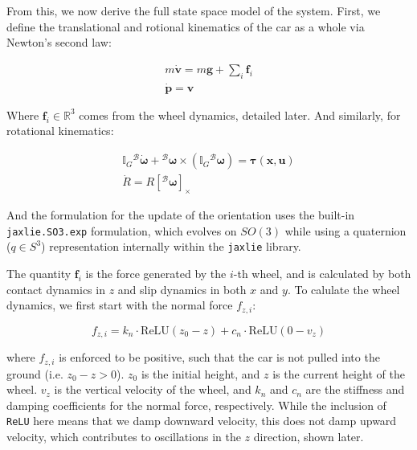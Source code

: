 From this, we now derive the full state space model of the system. First, we define the translational and rotional kinematics of the car as a whole via Newton's second law:

\begin{equation}
  \begin{gathered}
    m\dot{\mathbf{v}} = m\mathbf{g} + \sum_i \mathbf{f}_i \\
    \dot{\mathbf{p}} = \mathbf{v}
  \end{gathered}
\end{equation}

Where $\mathbf{f}_i\in\mathbb{R}^3$ comes from the wheel dynamics, detailed later. And similarly, for rotational kinematics:

\begin{equation}
  \begin{gathered}
    \mathbb{I}_G{}^\mathcal{B}\dot{\boldsymbol{\omega}} + {}^\mathcal{B}\boldsymbol{\omega} \times \left(\mathbb{I}_G{}^\mathcal{B}\boldsymbol{\omega}\right) = \boldsymbol{\tau}(\mathbf{x,u}) \\
    \dot{R} = R[{}^\mathcal{B}\boldsymbol{\omega}]_\times
  \end{gathered}
\end{equation}

And the formulation for the update of the orientation uses the built-in \texttt{jaxlie.SO3.exp} formulation, which evolves on $SO(3)$ while using a quaternion ($q\in S^3$) representation internally within the \texttt{jaxlie} library.

The quantity $\mathbf{f}_i$ is the force generated by the $i$-th wheel, and is calculated by both contact dynamics in $z$ and slip dynamics in both $x$ and $y$. To calulate the wheel dynamics, we first start with the normal force $f_{z,i}$:

\begin{equation}
  f_{z,i} = k_n \cdot \mathrm{ReLU}(z_0-z) + c_n \cdot \mathrm{ReLU}(0-v_z)
\end{equation}

where $f_{z,i}$ is enforced to be positive, such that the car is not pulled into the ground (i.e. $z_0-z>0$). $z_0$ is the initial height, and $z$ is the current height of the wheel. $v_z$ is the vertical velocity of the wheel, and $k_n$ and $c_n$ are the stiffness and damping coefficients for the normal force, respectively. While the inclusion of \texttt{ReLU} here means that we damp downward velocity, this does not damp upward velocity, which contributes to oscillations in the $z$ direction, shown later.

